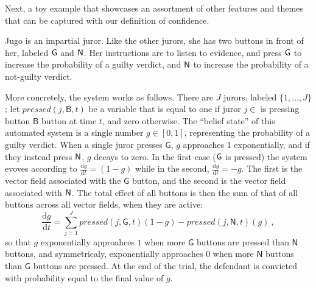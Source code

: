 \begin{subappendices}
    Next, a toy example that showcases an assortment of other features and themes that can be captured with our definition of confidence.

    \begin{example}\label{ex:jugo}
    \def\pressed(#1,#2,#3){\mathit{pressed}(#1,\mathsf{#2},#3)}
    Jugo is an impartial juror.
    Like the other jurors, she has two buttons in front of her,
    labeled $\sf G$ and $\sf N$.
    Her instructions are to listen to evidence, and press $\sf G$ to 
    increase the probability of a guilty verdict, and $\sf N$ 
    to increase the probability of a not-guilty verdict.

    More concretely, the system works as follows.
    There are $J$ jurors, labeled $\{1, \ldots, J\}$;
    let 
    $\pressed(j,B,t)$ be
    a variable that is equal to one if juror $j \in $
    is pressing button  $\mathsf B$ button at time $t$, and zero otherwise.
    The ``belief state'' of this automated system is
    a single number $g \in [0,1]$, representing the probability of a guilty verdict.
    When a single juror presses $\mathsf G$, $g$ approaches 1
    exponentially, and if they instead press $\sf N$, $g$ decays to zero.
    In the first case ($\sf G$ is pressed) the system evoves according to 
    $\frac{\mathrm dg}{\mathrm dt} = (1-g)$
    while in the second, 
    $\frac{\mathrm dg}{\mathrm dt} = -g$.
    The first is the vector field associated with the $\mathsf G$ button,
    and the second is the vector field associated with $\sf N$. 
    The total effect of all buttons is then the sum of that of all buttons across all vector fields, when they are active:
    \[
    	\frac{\mathrm dg}{\mathrm dt} = 
    	\sum_{j = 1}^J 
    		\pressed(j,G,t)
    		(1-g) 
    		-
    		\pressed(j,N,t)
    		(g)
    		~,
    \]
    so that $g$ exponentially approahces $1$ when more $\mathsf G$ buttons are pressed than $\mathsf N$ buttons,
    and symmetricaly, exponentially approaches $0$ when more $\mathsf N$ buttons than $\mathsf G$ buttons are pressed.
    At the end of the trial, the defendant is convicted with probability
    equal to the final value of $g$. 


\end{example}
\end{subappendices}
